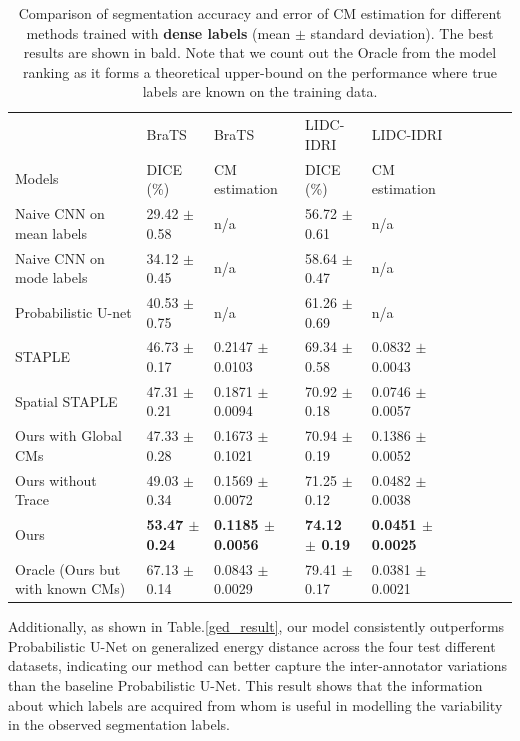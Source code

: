 \begin{table}[!t]
\scriptsize
	\center
	\begin{tabular}{@{}lllllllll}
		\hline
		 & BraTS & BraTS  & LIDC-IDRI  & LIDC-IDRI  \\
		Models & DICE (\%) & CM estimation & DICE (\%) & CM estimation \\
		  
		\hline	
		Naive CNN on mean labels & 29.42 $\pm$ 0.58  &  n/a & 56.72 $\pm$ 0.61  &  n/a  \\
		Naive CNN on mode labels & 34.12 $\pm$ 0.45  &  n/a & 58.64 $\pm$ 0.47  &  n/a  \\
		Probabilistic U-net \cite{kohl2018probabilistic}  & 40.53 $\pm$ 0.75   &  n/a  & 61.26 $\pm$ 0.69  &  n/a   \\
		STAPLE \cite{warfield2004simultaneous}& 46.73 $\pm$ 0.17  & 0.2147 $\pm$ 0.0103   & 69.34 $\pm$ 0.58  & 0.0832 $\pm$ 0.0043   \\ 
		Spatial STAPLE \cite{asman2012formulating} & 47.31 $\pm$ 0.21  & 0.1871 $\pm$ 0.0094   & 70.92 $\pm$ 0.18  &  0.0746 $\pm$ 0.0057   \\
		Ours with Global CMs &  47.33 $\pm $ 0.28  &  0.1673 $\pm $ 0.1021    & 70.94 $\pm $ 0.19  & 0.1386 $\pm $ 0.0052   \\
		Ours without Trace & 49.03 $\pm$ 0.34   & 0.1569 $\pm$ 0.0072   & 71.25 $\pm$ 0.12  & 0.0482 $\pm$ 0.0038    \\
		Ours & \textbf{53.47 $\pm $ 0.24}  & \textbf{0.1185 $\pm$ 0.0056 }  & \textbf{74.12 $\pm $ 0.19 } &  \textbf{0.0451 $\pm$ 0.0025     }\\
		Oracle (Ours but with known CMs)   & 67.13 $\pm$ 0.14  & 0.0843 $\pm$ 0.0029  & 79.41 $\pm$ 0.17  & 0.0381 $\pm$ 0.0021    \\ 
		\hline
	\end{tabular}%
    \caption{Comparison of segmentation accuracy and error of CM estimation for different methods trained with \textbf{dense labels} (mean $\pm$ standard deviation). The best results are shown in bald. Note that we count out the Oracle from the model ranking as it forms a theoretical upper-bound on the performance where true labels are known on the training data.}
\label{denselabebrats}
\end{table}

Additionally, as shown in Table.\ref{ged_result}, our model consistently outperforms Probabilistic U-Net on generalized energy distance across the four test different datasets, indicating our method can better capture the inter-annotator variations than the baseline Probabilistic U-Net. This result shows that the information about which labels are acquired from whom is useful in modelling the variability in the observed segmentation labels. 

